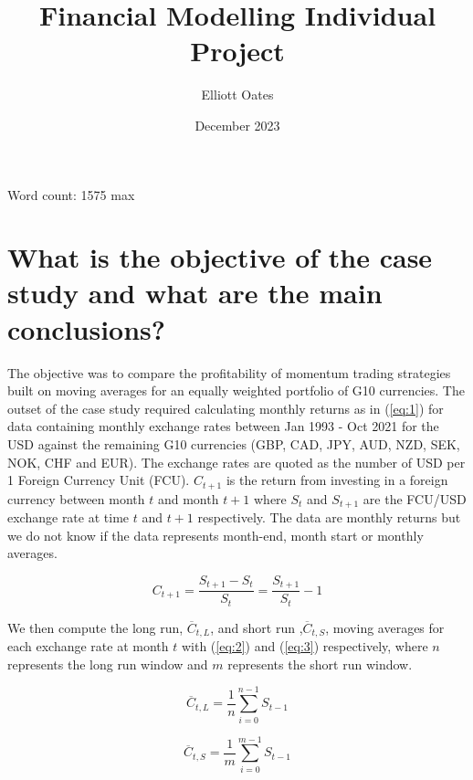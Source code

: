 \documentclass{article}
\title{Financial Modelling Individual Project}
\author{Elliott Oates}
\date{December 2023}
\begin{document}
\maketitle

Word count: 1575 max 

\newpage\section*{What is the objective of the case study and what are the main conclusions?}
The objective was to compare the profitability of momentum trading strategies built on moving averages for an equally weighted portfolio of G10 currencies. The outset of the case study required calculating monthly returns as in (\ref{eq:1}) for data containing monthly exchange rates between Jan 1993 - Oct 2021 for the USD against the remaining G10 currencies (GBP, CAD, JPY, AUD, NZD, SEK, NOK, CHF and EUR). The exchange rates are quoted as the number of USD per 1 Foreign Currency Unit (FCU).  $C_{t+1}$ is the return from investing in a foreign currency between month $t$ and month $t+1$ where $S_{t}$ and $S_{t+1}$ are the FCU/USD exchange rate at time $t$ and $t+1$ respectively. The data are monthly returns but we do not know if the data represents month-end, month start or monthly averages. 

\begin{equation}\label{eq:1}
    C_{t+1}=\frac{S_{t+1}-S_{t}}{S_{t}} = \frac{S_{t+1}}{S_{t}}-1
\end{equation}

We then compute the long run, $\overline{C}_{t,L}$, and short run ,$\overline{C}_{t,S}$, moving averages for each exchange rate at month $t$ with (\ref{eq:2}) and (\ref{eq:3}) respectively, where $n$ represents the long run window and $m$ represents the short run window. 

\begin{minipage}{0.45\textwidth}
\begin{equation}\label{eq:2}
    \overline{C}_{t,L} = \frac{1}{n}\sum_{i=0}^{n-1} S_{t-1}
\end{equation}
\end{minipage}
\hfill
\begin{minipage}{0.45\textwidth}
\begin{equation}\label{eq:3}
    \overline{C}_{t,S}= \frac{1}{m}\sum_{i=0}^{m-1} S_{t-1}
\end{equation}
\end{minipage}
\end{document}
